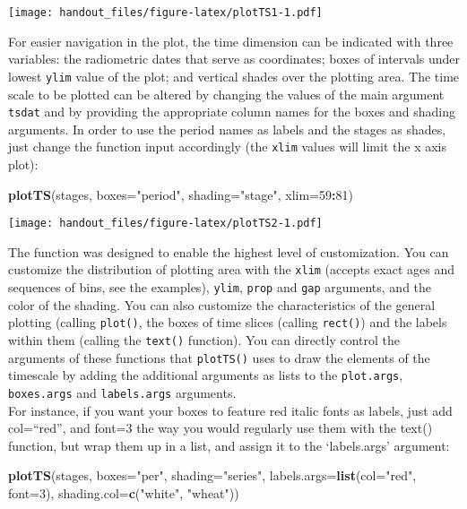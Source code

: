 \documentclass[]{article}
\newenvironment{Shaded}{\begin{snugshade}}{\end{snugshade}}
\newcommand{\DataTypeTok}[1]{\textcolor[rgb]{0.13,0.29,0.53}{#1}}
\newcommand{\DecValTok}[1]{\textcolor[rgb]{0.00,0.00,0.81}{#1}}
\newcommand{\KeywordTok}[1]{\textcolor[rgb]{0.13,0.29,0.53}{\textbf{#1}}}
\newcommand{\NormalTok}[1]{#1}
\newcommand{\OperatorTok}[1]{\textcolor[rgb]{0.81,0.36,0.00}{\textbf{#1}}}
\newcommand{\StringTok}[1]{\textcolor[rgb]{0.31,0.60,0.02}{#1}}
\begin{document}
\texttt{[image: handout\_files/figure-latex/plotTS1-1.pdf]}

For easier navigation in the plot, the time dimension can be indicated
with three variables: the radiometric dates that serve as coordinates;
boxes of intervals under lowest \texttt{ylim} value of the plot; and
vertical shades over the plotting area. The time scale to be plotted can
be altered by changing the values of the main argument \texttt{tsdat}
and by providing the appropriate column names for the boxes and shading
arguments. In order to use the period names as labels and the stages as
shades, just change the function input accordingly (the \texttt{xlim}
values will limit the x axis plot):

\begin{Shaded}
\begin{Highlighting}[]
\KeywordTok{plotTS}\NormalTok{(stages, }\DataTypeTok{boxes=}\StringTok{"period"}\NormalTok{, }\DataTypeTok{shading=}\StringTok{"stage"}\NormalTok{, }\DataTypeTok{xlim=}\DecValTok{59}\OperatorTok{:}\DecValTok{81}\NormalTok{)}
\end{Highlighting}
\end{Shaded}

\texttt{[image: handout\_files/figure-latex/plotTS2-1.pdf]}

The function was designed to enable the highest level of customization.
You can customize the distribution of plotting area with the
\texttt{xlim} (accepts exact ages and sequences of bins, see the
examples), \texttt{ylim}, \texttt{prop} and \texttt{gap} arguments, and
the color of the shading. You can also customize the characteristics of
the general plotting (calling \texttt{plot()}, the boxes of time slices
(calling \texttt{rect()}) and the labels within them (calling the
\texttt{text()} function). You can directly control the arguments of
these functions that \texttt{plotTS()} uses to draw the elements of the
timescale by adding the additional arguments as lists to the
\texttt{plot.args}, \texttt{boxes.args} and \texttt{labels.args}
arguments.\\
For instance, if you want your boxes to feature red italic fonts as
labels, just add col=``red'', and font=3 the way you would regularly use
them with the text() function, but wrap them up in a list, and assign it
to the `labels.args' argument:

\begin{Shaded}
\begin{Highlighting}[]
\KeywordTok{plotTS}\NormalTok{(stages, }\DataTypeTok{boxes=}\StringTok{"per"}\NormalTok{, }\DataTypeTok{shading=}\StringTok{"series"}\NormalTok{, }
  \DataTypeTok{labels.args=}\KeywordTok{list}\NormalTok{(}\DataTypeTok{col=}\StringTok{"red"}\NormalTok{, }\DataTypeTok{font=}\DecValTok{3}\NormalTok{), }\DataTypeTok{shading.col=}\KeywordTok{c}\NormalTok{(}\StringTok{"white"}\NormalTok{, }\StringTok{"wheat"}\NormalTok{))}
\end{Highlighting}
\end{Shaded}
\end{document}
